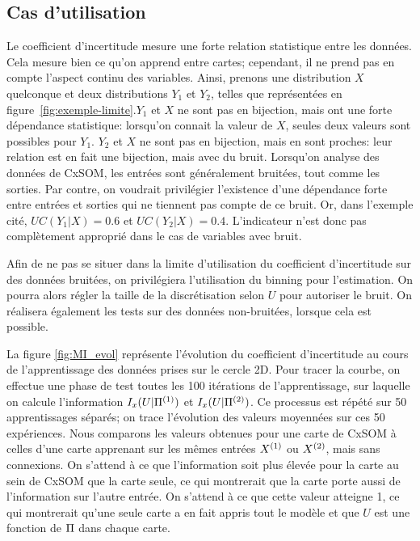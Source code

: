 
\subsection{Cas d'utilisation}

Le coefficient d'incertitude mesure une forte relation statistique entre les données. Cela mesure bien ce qu'on apprend entre cartes; cependant, il ne prend pas en compte l'aspect continu des variables. Ainsi, prenons une distribution $X$ quelconque et deux distributions $Y_1$ et $Y_2$, telles que représentées en figure~\ref{fig:exemple-limite}.$Y_1$ et $X$ ne sont pas en bijection, mais ont une forte dépendance statistique: lorsqu'on connait la valeur de $X$, seules deux valeurs sont possibles pour $Y_1$.
$Y_2$ et $X$ ne sont pas en bijection, mais en sont proches: leur relation est en fait une bijection, mais avec du bruit. Lorsqu'on analyse des données de CxSOM, les entrées sont généralement bruitées, tout comme les sorties. Par contre, on voudrait privilégier l'existence d'une dépendance forte entre entrées et sorties qui ne tiennent pas compte de ce bruit. Or, dans l'exemple cité, $UC(Y_1|X) = 0.6$ et $UC(Y_2|X) = 0.4$. L'indicateur n'est donc pas complètement approprié dans le cas de variables avec bruit.

Afin de ne pas se situer dans la limite d'utilisation du coefficient d'incertitude sur des données bruitées, on privilégiera l'utilisation du binning pour l'estimation. On pourra alors régler la taille de la discrétisation selon $U$ pour autoriser le bruit. On réalisera également les tests sur des données non-bruitées, lorsque cela est possible.

La figure \ref{fig:MI_evol} représente l'évolution du coefficient d'incertitude au cours de l'apprentissage des données prises sur le cercle 2D. Pour tracer la courbe, on effectue une phase de test toutes les 100 itérations de l'apprentissage, sur laquelle on calcule l'information $I_x(U|\Pi^{({1})})$ et $I_x(U|\Pi^{({2})})$. Ce processus est répété sur 50 apprentissages séparés; on trace l'évolution des valeurs moyennées sur ces 50 expériences.
Nous comparons les valeurs obtenues pour une carte de CxSOM à celles d'une carte apprenant sur les mêmes entrées $X^{({1})}$ ou $X^{({2})}$, mais sans connexions. On s'attend à ce que l'information soit plus élevée pour la carte au sein de CxSOM que la carte seule, ce qui montrerait que la carte porte aussi de l'information sur l'autre entrée. On s'attend à ce que cette valeur atteigne 1, ce qui montrerait qu'une seule carte a en fait appris tout le modèle et que $U$ est une fonction de $\Pi$ dans chaque carte.

